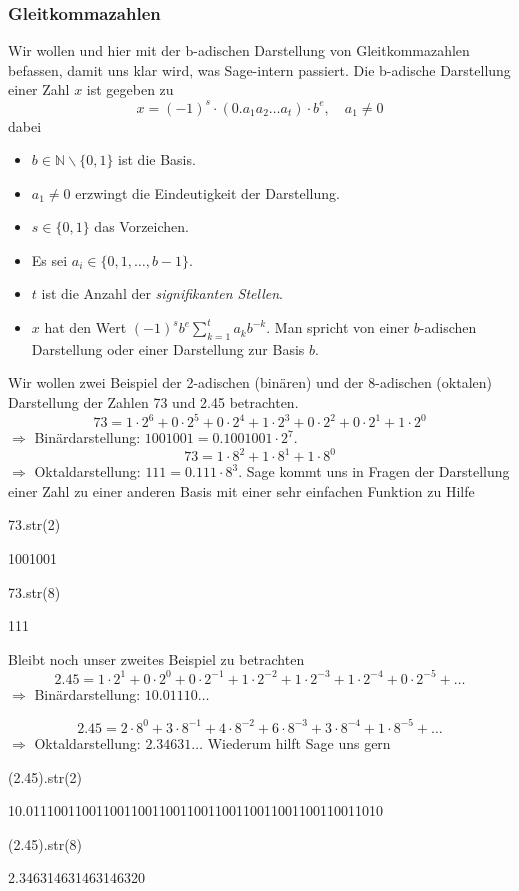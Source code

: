 \documentclass[fontsize=12pt,paper=a4,twoside,bibtotoc,idxtotoc,
liststotoc,pagesize,BCOR1.2cm,DIV15,chapterprefix,pagesize=pdftex]{scrbook}
\theoremstyle{plain}
\theoremstyle{definition}
\theoremstyle{remark}
\begin{document}
\subsubsection{Gleitkommazahlen}
Wir wollen und hier mit der b-adischen Darstellung von Gleitkommazahlen befassen, damit uns klar wird, was Sage-intern passiert. Die 
b-adische Darstellung einer Zahl $x$ ist gegeben zu
\[ x=(-1)^s \cdot (0.a_1a_2 \dots a_t) \cdot 
  b^e, \quad a_1 \neq 0
\]
dabei
\begin{itemize}
\item $b \in \mathbb{N} \smallsetminus \{ 0, 1\}$ ist die Basis.
\item $a_1 \neq 0$ erzwingt die Eindeutigkeit der Darstellung.
\item $s \in \{0, 1\}$ das Vorzeichen.
\item Es sei $a_i \in \{0,1,\dots, b-1 \}$.
\item $t$ ist die Anzahl der {\it signifikanten Stellen}.   
\item $x$ hat den Wert $(-1)^s b^e \sum_{k=1}^t a_k b^{-k}$. 
 Man spricht von einer $b$-adischen Darstellung oder einer Darstellung zur Basis $b$.
\end{itemize}
 Wir wollen zwei Beispiel der 2-adischen (binären) und der 8-adischen (oktalen) Darstellung der Zahlen 73 und 2.45 betrachten.
\[ 73 =  1 \cdot 2^6+ 0 \cdot 2^5 + 0 \cdot 2^4 +
   1 \cdot 2^3 + 0 \cdot 2^2
  +  0 \cdot 2^1 + 1 \cdot 2^0 
\]
$\Rightarrow$ Binärdarstellung: $1001001=0.1001001\cdot 2^7$.
\[
73= 1 \cdot 8^2 + 1 \cdot 8^1 + 1 \cdot 8^0
\]
 $\Rightarrow$ Oktaldarstellung: $111=0.111 \cdot 8^3$.
Sage kommt uns in Fragen der Darstellung einer Zahl zu einer anderen Basis mit einer sehr einfachen Funktion zu Hilfe
\begin{sagein}
73.str(2)
\end{sagein}
\begin{sageout}
1001001
\end{sageout}
\begin{sagein}
73.str(8)
\end{sagein}
\begin{sageout}
111
\end{sageout}
Bleibt noch unser zweites Beispiel zu betrachten
\[ 2.45 = 1 \cdot 2^1 + 0 \cdot 2^0 + 0 \cdot
  2^{-1} + 1 \cdot 2^{-2}+
 1 \cdot 2^{-3} + 1 \cdot 2^{-4}+ 0 \cdot 2^{-5}+ \dots \]
$\Rightarrow$ Binärdarstellung:  $10.01110 \dots$

\[ 2.45 = 2 \cdot 8^0 +  3 \cdot
  8^{-1} + 4 \cdot 8^{-2}+
6 \cdot 8^{-3} + 3 \cdot 8^{-4}+1 \cdot 8^{-5}+ \dots \]
$\Rightarrow$ Oktaldarstellung:  $2.34631 \dots$
Wiederum hilft Sage uns gern
 \begin{sagein}
 (2.45).str(2)
 \end{sagein}
 \begin{sageout}
10.011100110011001100110011001100110011001100110011010
 \end{sageout}
 \begin{sagein}
 (2.45).str(8)
 \end{sagein}
 \begin{sageout}
2.346314631463146320
 \end{sageout}
\end{document}
